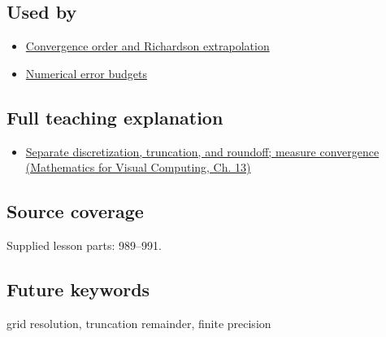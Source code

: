 \subsection{Used by}\label{appendix-6b0648b2b8e8-used-by}

\begin{itemize}
\tightlist
\item
  \hyperref[appendix-aca80b6bf17a]{Convergence order and Richardson extrapolation}
\item
  \hyperref[appendix-31b8c295e05f]{Numerical error budgets}
\end{itemize}

\subsection{Full teaching explanation}\label{appendix-6b0648b2b8e8-full-teaching-explanation}

\begin{itemize}
\tightlist
\item
  \href{../02-Mathematics-for-Visual-Computing/main.pdf\#nameddest=02-foundations-ii-ch029-separate-discretization-truncation-and-roundoff-measure-convergence}{Separate discretization, truncation, and roundoff; measure convergence (Mathematics for Visual Computing, Ch. 13)}
\end{itemize}

\subsection{Source coverage}\label{appendix-6b0648b2b8e8-source-coverage}

Supplied lesson parts: 989--991.

\subsection{Future keywords}\label{appendix-6b0648b2b8e8-future-keywords}

grid resolution, truncation remainder, finite precision
